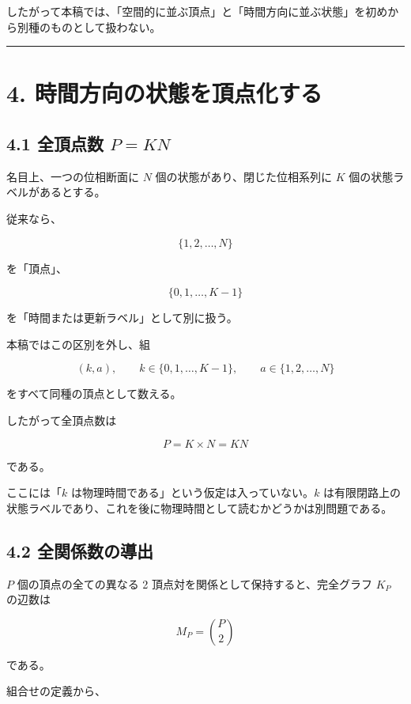 \documentclass[
  a4paper,
]{ltjsarticle}
\begin{document}
したがって本稿では、「空間的に並ぶ頂点」と「時間方向に並ぶ状態」を初めから別種のものとして扱わない。

\begin{center}\rule{0.5\linewidth}{0.5pt}\end{center}

\section{4.
時間方向の状態を頂点化する}\label{ux6642ux9593ux65b9ux5411ux306eux72b6ux614bux3092ux9802ux70b9ux5316ux3059ux308b}

\subsection{\texorpdfstring{4.1 全頂点数
\(P=KN\)}{4.1 全頂点数 P=KN}}\label{ux5168ux9802ux70b9ux6570-pkn}

名目上、一つの位相断面に \(N\) 個の状態があり、閉じた位相系列に \(K\)
個の状態ラベルがあるとする。

従来なら、

\[
\{1,2,\ldots,N\}
\]

を「頂点」、

\[
\{0,1,\ldots,K-1\}
\]

を「時間または更新ラベル」として別に扱う。

本稿ではこの区別を外し、組

\[
(k,a),
\qquad
k\in\{0,1,\ldots,K-1\},
\qquad
a\in\{1,2,\ldots,N\}
\]

をすべて同種の頂点として数える。

したがって全頂点数は

\[
P
=
K\times N
=
KN
\]

である。

ここには「\(k\) は物理時間である」という仮定は入っていない。\(k\)
は有限閉路上の状態ラベルであり、これを後に物理時間として読むかどうかは別問題である。

\subsection{4.2
全関係数の導出}\label{ux5168ux95a2ux4fc2ux6570ux306eux5c0eux51fa}

\(P\) 個の頂点の全ての異なる 2 頂点対を関係として保持すると、完全グラフ
\(K_P\) の辺数は

\[
M_P
=
\binom{P}{2}
\]

である。

組合せの定義から、
\end{document}
